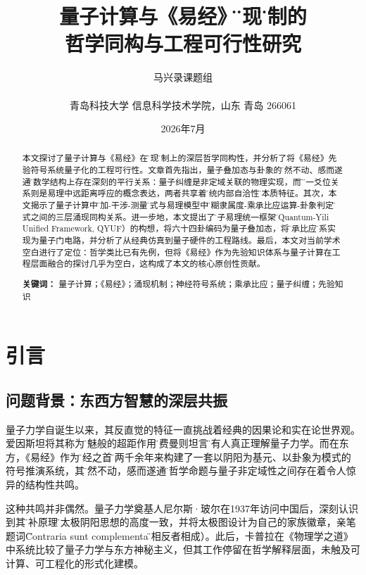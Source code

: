 \documentclass[twocolumn]{article}
\title{\textbf{量子计算与《易经》\"涌现\"机制的\\哲学同构与工程可行性研究}}
\author{马兴录课题组\\\\
青岛科技大学 信息科学技术学院，山东 青岛 266061}
\date{2026年7月}
\begin{document}
\maketitle

\begin{abstract}
本文探讨了量子计算与《易经》在\"涌现\"机制上的深层哲学同构性，并分析了将《易经》先验符号系统量子化的工程可行性。文章首先指出，量子叠加态与卦象的\"寂然不动、感而遂通\"在数学结构上存在深刻的平行关系：量子纠缠是非定域关联的物理实现，而\"应\"这一爻位关系则是易理中远距离呼应的概念表达，两者共享着\"系统内部自洽性\"的本质特征。其次，本文揭示了量子计算中\"叠加-干涉-测量\"范式与易理模型中\"模糊隶属度-乘承比应运算-卦象判定\"范式之间的三层涌现同构关系。进一步地，本文提出了\"量子易理统一框架\"（Quantum-Yili Unified Framework, QYUF）的构想，将六十四卦编码为量子叠加态，将\"乘承比应\"关系实现为量子门电路，并分析了从经典仿真到量子硬件的工程路线。最后，本文对当前学术空白进行了定位：哲学类比已有先例，但将《易经》作为先验知识体系与量子计算在工程层面融合的探讨几乎为空白，这构成了本文的核心原创性贡献。

\textbf{关键词：} 量子计算；《易经》；涌现机制；神经符号系统；乘承比应；量子纠缠；先验知识
\end{abstract}

\section{引言}

\subsection{问题背景：东西方智慧的深层共振}

量子力学自诞生以来，其反直觉的特征一直挑战着经典的因果论和实在论世界观。爱因斯坦将其称为\"鬼魅般的超距作用\"，费曼则坦言\"没有人真正理解量子力学\"\cite{feynman1965}。而在东方，《易经》作为\"群经之首\"，两千余年来构建了一套以阴阳为基元、以卦象为模式的符号推演系统，其\"寂然不动，感而遂通\"的哲学命题与量子非定域性之间存在着令人惊异的结构性共鸣。

这种共鸣并非偶然。量子力学奠基人尼尔斯·玻尔在1937年访问中国后，深刻认识到其\"互补原理\"与太极阴阳思想的高度一致，并将太极图设计为自己的家族徽章，亲笔题词\"Contraria sunt complementa\"（相反者相成）\cite{bohr1949}。此后，卡普拉在《物理学之道》中系统比较了量子力学与东方神秘主义\cite{capra1975}，但其工作停留在哲学解释层面，未触及可计算、可工程化的形式化建模。
\end{document}
